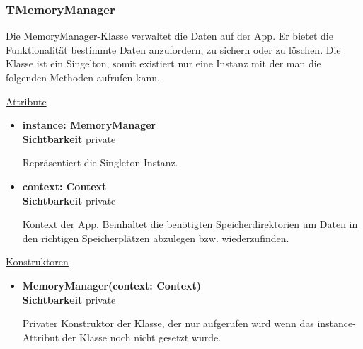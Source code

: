 \subsubsection{TMemoryManager} \label{app:klasse:MemoryManager}
Die MemoryManager-Klasse verwaltet die Daten auf der App. Er bietet die Funktionalität bestimmte Daten anzufordern, zu sichern oder zu löschen. Die Klasse ist ein Singelton, somit existiert nur eine Instanz mit der man die folgenden Methoden aufrufen kann.\newline

\underline{Attribute}
\begin{itemize}
\itemsep0pt
\item \textbf{instance: MemoryManager} \hfill\\ 
\textbf{Sichtbarkeit} private

Repräsentiert die Singleton Instanz.

\item \textbf{context: Context} \hfill\\ 
\textbf{Sichtbarkeit} private

Kontext der App. Beinhaltet die benötigten Speicherdirektorien um Daten in den richtigen Speicherplätzen abzulegen bzw. wiederzufinden.
\end{itemize}

\underline{Konstruktoren}
\begin{itemize}
\itemsep0pt
\item \textbf{MemoryManager(context: Context)} \hfill\\
\textbf{Sichtbarkeit} private

Privater Konstruktor der Klasse, der nur aufgerufen wird wenn das instance-Attribut der Klasse noch nicht gesetzt wurde.
\end{itemize}

